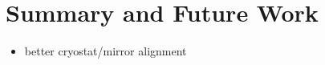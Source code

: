 \chapter{Summary and Future Work} \label{c:summary}

\begin{itemize}
\item better cryostat/mirror alignment
\end{itemize}
